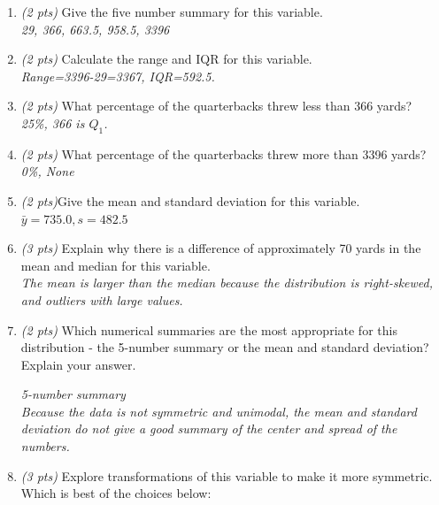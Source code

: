 \documentclass{article}[11pt]
\begin{document}
\begin{enumerate}
\begin{enumerate}
{\em The distribution is right-skewed, unimodal, centered at around 500-600 yards, with a few outliers at 2500 and 3500 yards.}

\item {\em (2 pts)} Give the five number summary for this variable.\\

{\em 29, 366, 663.5, 958.5, 3396}

\item {\em (2 pts)} Calculate the range and IQR for this variable.\\

{\em Range=3396-29=3367, IQR=592.5.}

\item {\em (2 pts)} What percentage of the quarterbacks  threw less than 366 yards? \\

{\em  25\%, 366 is $Q_1$.}

\item {\em (2 pts)} What percentage of the quarterbacks  threw more than 3396 yards?  \\

{\em 0\%, None}

\item {\em (2 pts)}Give the mean and standard deviation for this variable.\\

{\em $\bar{y}=735.0, s=482.5$} 

\item {\em (3 pts)} Explain why there is a difference of approximately 70 yards in the mean and median for this variable.\\

{\em The mean is larger than the median because the distribution is right-skewed, and outliers with large values.}

\item {\em (2 pts)} Which numerical summaries are the most appropriate for this distribution - the 5-number summary or the mean and standard deviation?  Explain your answer.

\hspace{1in} {\em 5-number summary}  \\

{\em Because the data is not symmetric and unimodal, the mean and standard deviation do not give a good summary of the center and spread of the numbers. }\\

\item {\em (3 pts)} Explore transformations of this variable to make it more symmetric. Which is best of the choices below:


\end{enumerate}
\end{enumerate}
\end{document}
